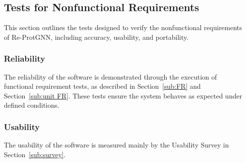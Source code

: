 \documentclass[12pt, titlepage]{article}
\begin{document}
\subsection{Tests for Nonfunctional Requirements}

This section outlines the tests designed to verify the nonfunctional requirements of Re-ProtGNN, including accuracy, usability, and portability.

\subsubsection{Reliability}
		
The reliability of the software is demonstrated through the execution of functional requirement tests, as described in Section~\ref{sub:FR} and Section~\ref{sub:unit FR}. These tests ensure the system behaves as expected under defined conditions.




					
					
					
					


\subsubsection{Usability}

The usability of the software is measured mainly by the Usability Survey in Section~\ref{sub:survey}.

\end{document}

